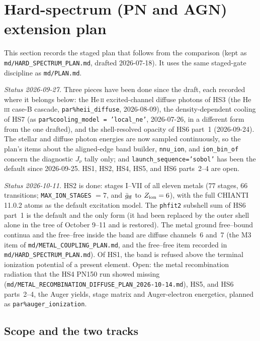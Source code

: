 \documentclass[english,a4paper]{my_memo}
\newcommand{\code}[1]{\texttt{#1}}
\newcommand{\HeII}{He\,\textsc{ii}}
\newcommand{\HeIII}{He\,\textsc{iii}}
\begin{document}
\section{Hard-spectrum (PN and AGN) extension plan}
\label{sec:hardplan}

This section records the staged plan that follows from the comparison
(kept as \code{md/HARD\_SPECTRUM\_PLAN.md}, drafted 2026-07-18).  It uses
the same staged-gate discipline as \code{md/PLAN.md}.

\emph{Status 2026-09-27.}  Three pieces have been done since the draft, each
recorded where it belongs below: the \HeII{} excited-channel diffuse photons
of HS3 (the \HeIII{} case-B cascade, \code{par\%heii\_diffuse},
2026-08-09), the density-dependent cooling of HS7 (as
\code{par\%cooling\_model = 'local\_ne'}, 2026-07-26, in a different form
from the one drafted), and the shell-resolved opacity of HS6 part~1
(2026-09-24).  The stellar and diffuse photon energies are now sampled
continuously, so the plan's items about the aligned-edge band builder,
\code{nnu\_ion}, and \code{ion\_bin\_of} concern the diagnostic $J_\nu$
tally only; and \code{launch\_sequence='sobol'} has been the default since
2026-09-25.  HS1, HS2, HS4, HS5, and HS6 parts~2--4 are open.

\emph{Status 2026-10-11.}  HS2 is done: stages I--VII of all eleven
metals (77 stages, 66 transitions; \code{MAX\_ION\_STAGES} $=7$, and
$\bar g_{\rm ff}$ to $Z_{\rm ion}=6$), with the full CHIANTI 11.0.2 atoms
as the default excitation model.  The \code{phfit2} subshell sum of HS6
part~1 is the default and the only form (it had been replaced by the outer
shell alone in the tree of October 9--11 and is restored).  The metal ground
free--bound continua and the free--free inside the band are diffuse
channels~6 and~7 (the M3 item of \code{md/METAL\_COUPLING\_PLAN.md}, and
the free--free item recorded in \code{md/HARD\_SPECTRUM\_PLAN.md}).  Of HS1,
the band is refused above the terminal ionization potential of a present
element.  Open: the metal recombination radiation that the HS4 PN150 run
showed missing (\code{md/METAL\_RECOMBINATION\_DIFFUSE\_PLAN\_2026-10-14.md}), HS5,
and HS6 parts~2--4, the Auger yields, stage matrix and Auger-electron
energetics, planned as \code{par\%auger\_ionization}.

\subsection{Scope and the two tracks}
\end{document}
